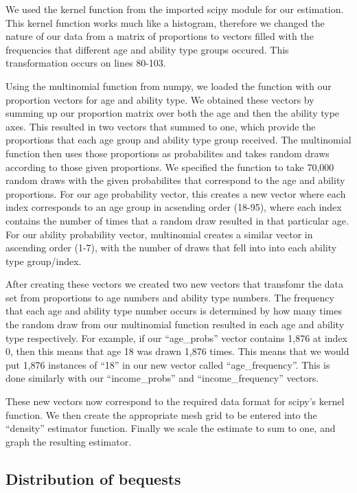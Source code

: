 \documentclass[letterpaper,12pt]{article}
\newcommand{\quotes}[1]{``#1''}
\theoremstyle{definition}
\begin{document}
\begin{spacing}{1.5}
We used the kernel function from the imported scipy module for our estimation. This kernel function works much like a histogram, therefore we changed the nature of our data from a matrix of proportions to vectors filled with the frequencies that different age and ability type groups occured. This transformation occurs on lines 80-103. 

Using the multinomial function from numpy, we loaded the function with our proportion vectors for age and ability type. We obtained these vectors by summing up our proportion matrix over both the age and then the ability type axes. This resulted in two vectors that summed to one, which provide the proportions that each age group and ability type group received. The multinomial function then uses those proportions as probabilites and takes random draws according to those given proportions. We specified the function to take 70,000 random draws with the given probabilites that correspond to the age and ability proportions. For our age probability vector, this creates a new vector where each index corresponds to an age group in acsending order (18-95), where each index contains the number of times that a random draw resulted in that particular age. For our ability probability vector, multinomial creates a similar vector in ascending order (1-7), with the number of draws that fell into into each ability type group/index.

After creating these vectors we created two new vectors that transfomr the data set from proportions to age numbers and ability type numbers. The frequency that each age and ability type number occurs is determined by how many times the random draw from our multinomial function resulted in each age and ability type respectively. For example, if our \quotes{age\_probs} vector contains 1,876 at index 0, then this means that age 18 was drawn 1,876 times. This means that we would put 1,876 instances of \quotes{18} in our new vector called \quotes{age\_frequency}. This is done similarly with our \quotes{income\_probs} and \quotes{income\_frequency} vectors.

These new vectors now correspond to the required data format for scipy's kernel function. We then create the appropriate mesh grid to be entered into the \quotes{density} estimator function. Finally we scale the estimate to sum to one, and graph the resulting estimator.

  \subsection{Distribution of bequests}\label{SecDistEst}


\end{spacing}
\end{document}
